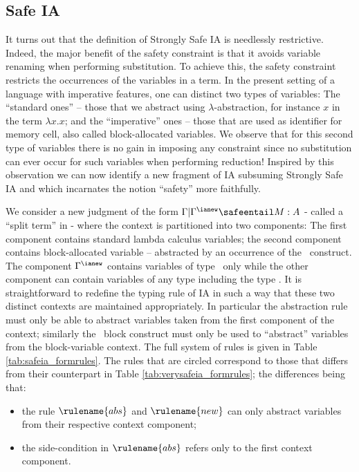 \subsection{Safe IA}

It turns out that the definition of Strongly Safe IA is needlessly
restrictive. Indeed, the major benefit of the safety constraint is
that it avoids variable renaming when performing substitution. To
achieve this, the safety constraint restricts the occurrences of the
variables in a term. In the present setting of a language with
imperative features, one can distinct two types of variables: The
``standard ones'' -- those that we abstract using
$\lambda$-abstraction, for instance $x$ in the term $\lambda x . x$;
and the ``imperative'' ones -- those that are used as identifier for
memory cell, also called block-allocated variables. We observe that
for this second type of variables there is no gain in imposing any
constraint since no substitution can ever occur for such variables
when performing reduction! Inspired by this observation we can now identify a new fragment of IA subsuming Strongly Safe IA and which incarnates the notion ``safety''
 more faithfully.

We consider a new judgment of the form $\Gamma | \Gamma^{\ianew}
\safeentail M : A$ - called a ``split term'' in \cite{abramsky:game-semantics-tutorial} - where the context is partitioned into two
components: The first component contains standard lambda calculus
variables; the second component contains block-allocated variable --
abstracted by an occurrence of the \ianew\ construct. The component
$\Gamma^{\ianew}$ contains variables of type \iavar\ only while the
other component can contain variables of any type including the type
\iavar. It is straightforward to redefine the typing rule of IA in
such a way that these two distinct contexts are maintained
appropriately. In particular the abstraction rule must only be able
to abstract variables taken from the first component of the context;
similarly the \ianew\ block construct must only be used to
``abstract'' variables from the block-variable context. The full
system of rules is given in Table \ref{tab:safeia_formrules}. The
rules that are circled correspond to those that differs from their
counterpart in Table \ref{tab:verysafeia_formrules}; the differences
being that:
\begin{itemize}
\item the rule $\rulename{abs}$ and $\rulename{new}$ can only
abstract variables from their respective context component;
\item the side-condition in $\rulename{abs}$ refers only to
the first context component.
\end{itemize}

